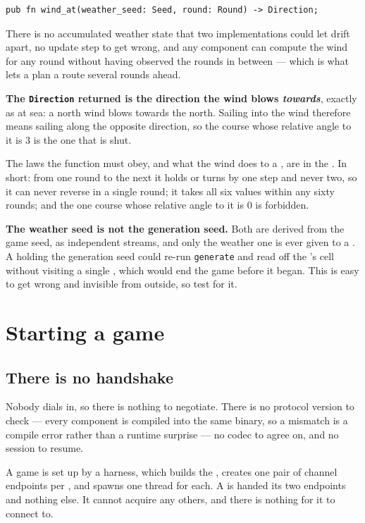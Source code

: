 \documentclass{article}
\begin{document}
\begin{lstlisting}
pub fn wind_at(weather_seed: Seed, round: Round) -> Direction;
\end{lstlisting}

There is no accumulated weather state that two implementations could let drift apart, no update
step to get wrong, and any component can compute the wind for any round without having observed
the rounds in between --- which is what lets a \ship{} plan a route several rounds ahead.

\textbf{The \texttt{Direction} returned is the direction the wind blows \emph{towards}}, exactly as
at sea: a north wind blows towards the north. Sailing into the wind therefore means sailing along
the opposite direction, so the course whose relative angle to it is $3$ is the one that is shut.

The laws the function must obey, and what the wind does to a \ship, are in the \MD. In short: from
one round to the next it holds or turns by one step and never two, so it can never reverse in a
single round; it takes all six values within any sixty rounds; and the one course whose relative
angle to it is $0$ is forbidden.

\textbf{The weather seed is not the generation seed.} Both are derived from the game seed, as
independent streams, and only the weather one is ever given to a \ship. A \ship{} holding the
generation seed could re-run \texttt{generate} and read off the \treasure{}'s cell without visiting
a single \island, which would end the game before it began. This is easy to get wrong and invisible
from outside, so test for it.

\newpage
\section{Starting a game}
\label{proto:connect}

\subsection{There is no handshake}

Nobody dials in, so there is nothing to negotiate. There is no protocol version to check --- every
component is compiled into the same binary, so a mismatch is a compile error rather than a runtime
surprise --- no codec to agree on, and no session to resume.

A game is set up by a harness, which builds the \chart, creates one pair of channel endpoints per
\ship, and spawns one thread for each. A \ship{} is handed its two endpoints and nothing else. It
cannot acquire any others, and there is nothing for it to connect to.
\end{document}
